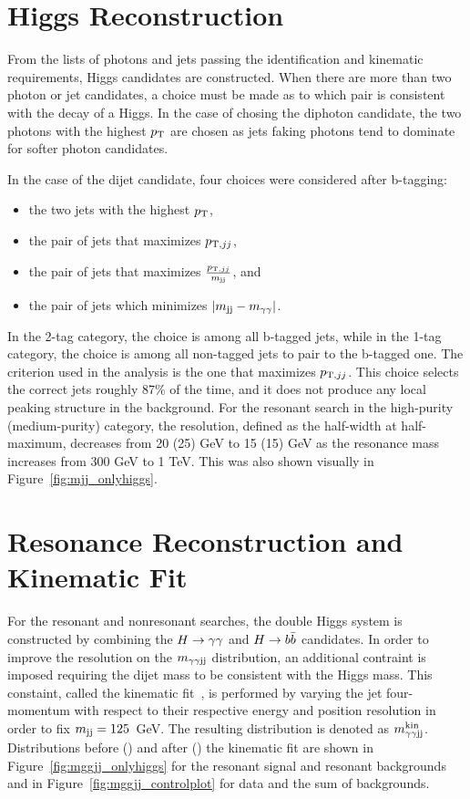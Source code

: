 \section{Higgs Reconstruction\label{sec:higgsreconstruction}}

From the lists of photons and jets passing the identification and kinematic requirements, Higgs
candidates are constructed. When there are more than two photon or jet candidates, a choice
must be made as to which pair is consistent with the decay of a Higgs. In the case
of chosing the diphoton candidate, the two photons with the highest $p_{\rm T}$ are chosen
as jets faking photons tend to dominate for softer photon candidates.

In the case of the dijet candidate, four choices were considered after b-tagging:
\begin{itemize}
\item the two jets with the highest $p_{\rm T}$,
\item the pair of jets that maximizes $p_{{\rm T},jj}$,
\item the pair of jets that maximizes $\frac{p_{{\rm T},jj}}{m_{\rm jj}}$, and
\item the pair of jets which minimizes $|m_{\rm jj}-m_{\gamma\gamma}|$.
\end{itemize}
In the 2-tag category, the choice is among all b-tagged jets, while in the 1-tag category, the
choice is among all non-tagged jets to pair to the b-tagged one.
The criterion used in the analysis is the one that maximizes $p_{{\rm T},jj}$. 
This choice selects the correct jets roughly 87\% of the time, and it does not produce any local peaking
structure in the background. For the resonant search
in the high-purity (medium-purity) category, the resolution, defined as the half-width at half-maximum,
decreases from 20 (25) GeV to 15 (15) GeV as the resonance mass increases from 300 GeV to 1 TeV.
This was also shown visually in Figure~\ref{fig:mjj_onlyhiggs}.

\section{Resonance Reconstruction and Kinematic Fit\label{sec:Xreconstruction}}

For the resonant and nonresonant searches, the double Higgs system is constructed
by combining the $H\to\gamma\gamma$ and $H\to b\bar{b}$ candidates.
In order to improve the resolution on the $m_{\gamma\gamma {\rm jj}}$ distribution, an additional contraint is imposed
requiring the dijet mass to be consistent with the Higgs mass. This constaint, called the
kinematic fit~\cite{Chatrchyan:2013yoa}, is performed by varying the jet four-momentum
with respect to their
respective energy and position resolution in order to fix $m_{\rm jj} = 125$~GeV.
The resulting distribution is denoted as $m_{\gamma\gamma {\rm jj}}^{\rm kin}$. Distributions before (\Mggjj) and after (\Mggjjk)
the kinematic fit
are shown in Figure~\ref{fig:mggjj_onlyhiggs} for the resonant signal and resonant backgrounds
and in Figure~\ref{fig:mggjj_controlplot} for data and the sum of backgrounds.

